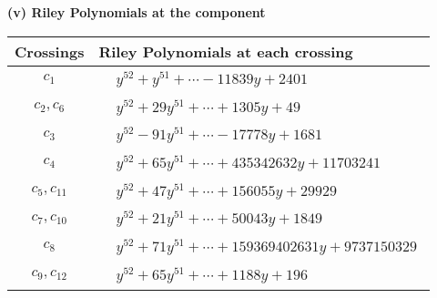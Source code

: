 \documentclass[1p]{elsarticle_modified}
\theoremstyle{definition}
\begin{document}
\newpage\renewcommand{\arraystretch}{1}
\flushleft \textbf{(v) Riley Polynomials at the component}\newline \\
\begin{tabular}{m{50pt}|m{274pt}}
Crossings & \hspace{64pt}Riley Polynomials at each crossing \\
\hline $$\begin{aligned}c_{1}\end{aligned}$$&$\begin{aligned}
&y^{52}+y^{51}+\cdots-11839 y+2401
\end{aligned}$\\
\hline $$\begin{aligned}c_{2},c_{6}\end{aligned}$$&$\begin{aligned}
&y^{52}+29 y^{51}+\cdots+1305 y+49
\end{aligned}$\\
\hline $$\begin{aligned}c_{3}\end{aligned}$$&$\begin{aligned}
&y^{52}-91 y^{51}+\cdots-17778 y+1681
\end{aligned}$\\
\hline $$\begin{aligned}c_{4}\end{aligned}$$&$\begin{aligned}
&y^{52}+65 y^{51}+\cdots+435342632 y+11703241
\end{aligned}$\\
\hline $$\begin{aligned}c_{5},c_{11}\end{aligned}$$&$\begin{aligned}
&y^{52}+47 y^{51}+\cdots+156055 y+29929
\end{aligned}$\\
\hline $$\begin{aligned}c_{7},c_{10}\end{aligned}$$&$\begin{aligned}
&y^{52}+21 y^{51}+\cdots+50043 y+1849
\end{aligned}$\\
\hline $$\begin{aligned}c_{8}\end{aligned}$$&$\begin{aligned}
&y^{52}+71 y^{51}+\cdots+159369402631 y+9737150329
\end{aligned}$\\
\hline $$\begin{aligned}c_{9},c_{12}\end{aligned}$$&$\begin{aligned}
&y^{52}+65 y^{51}+\cdots+1188 y+196
\end{aligned}$\\
\hline
\end{tabular}\\~\\
\end{document}

